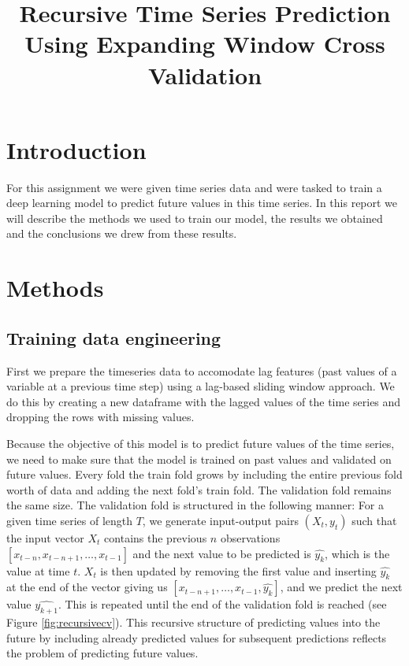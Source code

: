 \documentclass[conference]{IEEEtran}
\begin{document}
\title{Recursive Time Series Prediction Using Expanding Window Cross Validation\\}

\author{
\and
{}
\and
{}
\and
{}
}

\maketitle

\section{Introduction}
For this assignment we were given time series data and were tasked to train a deep learning model
to predict future values in this time series. In this report we will describe the methods we used 
to train our model, the results we obtained and the conclusions we drew from these results.

\section{Methods}
\subsection{Training data engineering}\label{traindataengineer}
First we prepare the timeseries data to accomodate lag features (past values of a variable at a
previous time step) using a lag-based sliding window approach. We do this by creating a new 
dataframe with the lagged values of the time series and dropping the rows with missing values.

Because the objective of this model is to predict future values of the time series, we need to
make sure that the model is trained on past values and validated on future values. Every fold the 
train fold grows by including the entire previous fold worth of data and adding the next fold's train fold.  
The validation fold remains the same size. The validation fold is structured in the following manner:
For a given time series of length $T$, we generate input-output pairs $(X_t,y_t)$ such that the 
input vector $X_t$ contains the previous $n$ observations $[x_{t-n}, x_{t-n+1}, \ldots, x_{t-1}]$ 
and the next value to be predicted is $\hat{y_k}$, which is the value at time $t$. $X_t$ is then 
updated by removing the first value and inserting $\hat{y_k}$ at the end of the vector giving us
$[x_{t-n+1}, \ldots, x_{t-1}, \hat{y_k}]$, and we predict the next value $\hat{y_{k+1}}$. This is 
repeated until the end of the validation fold is reached (see Figure \ref{fig:recursivecv}). This recursive structure of predicting 
values into the future by including already predicted values for subsequent predictions reflects 
the problem of predicting future values. 
\end{document}
